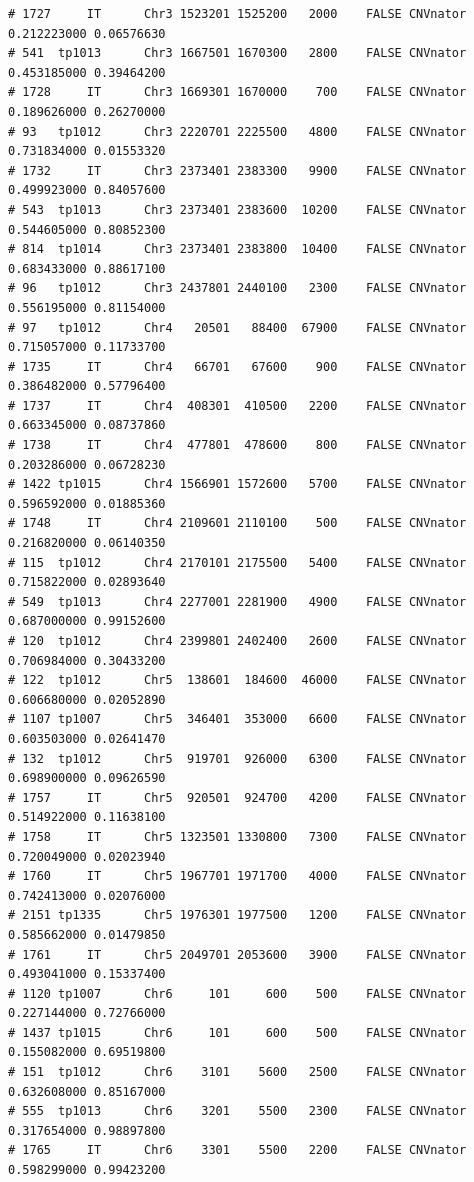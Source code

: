 \documentclass{article}\usepackage[]{graphicx}\usepackage[]{color}
\makeatletter
\newenvironment{kframe}{%
 \def\at@end@of@kframe{}%
 \ifinner\ifhmode%
  \def\at@end@of@kframe{\end{minipage}}%
  \begin{minipage}{\columnwidth}%
 \fi\fi%
 \def\FrameCommand##1{\hskip\@totalleftmargin \hskip-\fboxsep
 \colorbox{shadecolor}{##1}\hskip-\fboxsep
     \hskip-\linewidth \hskip-\@totalleftmargin \hskip\columnwidth}%
 \MakeFramed {\advance\hsize-\width
   \@totalleftmargin\z@ \linewidth\hsize
   \@setminipage}}%
 {\par\unskip\endMakeFramed%
 \at@end@of@kframe}
\newenvironment{knitrout}{}{} %
\makeatother
\begin{document}
\begin{knitrout}
\begin{kframe}
\begin{verbatim}
# 1727     IT      Chr3 1523201 1525200   2000    FALSE CNVnator 0.212223000 0.06576630
# 541  tp1013      Chr3 1667501 1670300   2800    FALSE CNVnator 0.453185000 0.39464200
# 1728     IT      Chr3 1669301 1670000    700    FALSE CNVnator 0.189626000 0.26270000
# 93   tp1012      Chr3 2220701 2225500   4800    FALSE CNVnator 0.731834000 0.01553320
# 1732     IT      Chr3 2373401 2383300   9900    FALSE CNVnator 0.499923000 0.84057600
# 543  tp1013      Chr3 2373401 2383600  10200    FALSE CNVnator 0.544605000 0.80852300
# 814  tp1014      Chr3 2373401 2383800  10400    FALSE CNVnator 0.683433000 0.88617100
# 96   tp1012      Chr3 2437801 2440100   2300    FALSE CNVnator 0.556195000 0.81154000
# 97   tp1012      Chr4   20501   88400  67900    FALSE CNVnator 0.715057000 0.11733700
# 1735     IT      Chr4   66701   67600    900    FALSE CNVnator 0.386482000 0.57796400
# 1737     IT      Chr4  408301  410500   2200    FALSE CNVnator 0.663345000 0.08737860
# 1738     IT      Chr4  477801  478600    800    FALSE CNVnator 0.203286000 0.06728230
# 1422 tp1015      Chr4 1566901 1572600   5700    FALSE CNVnator 0.596592000 0.01885360
# 1748     IT      Chr4 2109601 2110100    500    FALSE CNVnator 0.216820000 0.06140350
# 115  tp1012      Chr4 2170101 2175500   5400    FALSE CNVnator 0.715822000 0.02893640
# 549  tp1013      Chr4 2277001 2281900   4900    FALSE CNVnator 0.687000000 0.99152600
# 120  tp1012      Chr4 2399801 2402400   2600    FALSE CNVnator 0.706984000 0.30433200
# 122  tp1012      Chr5  138601  184600  46000    FALSE CNVnator 0.606680000 0.02052890
# 1107 tp1007      Chr5  346401  353000   6600    FALSE CNVnator 0.603503000 0.02641470
# 132  tp1012      Chr5  919701  926000   6300    FALSE CNVnator 0.698900000 0.09626590
# 1757     IT      Chr5  920501  924700   4200    FALSE CNVnator 0.514922000 0.11638100
# 1758     IT      Chr5 1323501 1330800   7300    FALSE CNVnator 0.720049000 0.02023940
# 1760     IT      Chr5 1967701 1971700   4000    FALSE CNVnator 0.742413000 0.02076000
# 2151 tp1335      Chr5 1976301 1977500   1200    FALSE CNVnator 0.585662000 0.01479850
# 1761     IT      Chr5 2049701 2053600   3900    FALSE CNVnator 0.493041000 0.15337400
# 1120 tp1007      Chr6     101     600    500    FALSE CNVnator 0.227144000 0.72766000
# 1437 tp1015      Chr6     101     600    500    FALSE CNVnator 0.155082000 0.69519800
# 151  tp1012      Chr6    3101    5600   2500    FALSE CNVnator 0.632608000 0.85167000
# 555  tp1013      Chr6    3201    5500   2300    FALSE CNVnator 0.317654000 0.98897800
# 1765     IT      Chr6    3301    5500   2200    FALSE CNVnator 0.598299000 0.99423200

\end{verbatim}
\end{kframe}
\end{knitrout}
\end{document}

